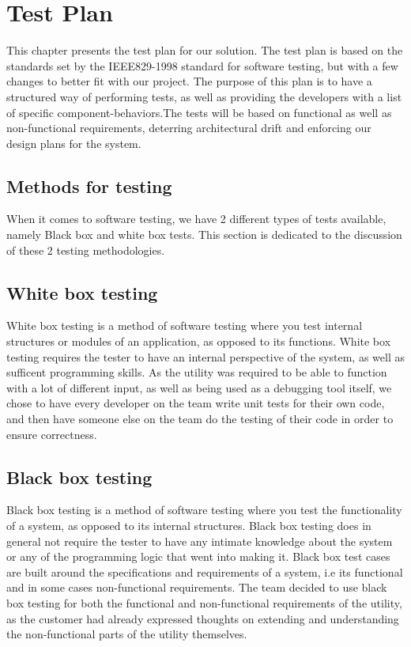 \chapter{Test Plan}
This chapter presents the test plan for our solution. The test plan is based on
the standards set by the IEEE829-1998 standard for software testing, but with a
few changes to better fit with our project. The purpose of this plan is to have
a structured way of performing tests, as well as providing the developers with
a list of specific component-behaviors.The tests will be based on functional as
well as non-functional requirements, deterring architectural drift and
enforcing our design plans for the system.

\section{Methods for testing}
When it comes to software testing, we have 2 different types of tests available, namely Black box and white box tests. This section is dedicated to the discussion of these 2 testing methodologies.

\section{White box testing}
White box testing is a method of software testing where you test internal structures or modules of an application, as opposed to its functions. White box testing requires the tester to have an internal perspective of the system, as well as sufficent programming skills. As the utility was required to be able to function with a lot of different input, as well as being used as a debugging tool itself, we chose to have every developer on the team write unit tests for their own code, and then have someone else on the team do the testing of their code in order to ensure correctness.

\section{Black box testing}
Black box testing is a method of software testing where you test the functionality of a system, as opposed to its internal structures. Black box testing does in general not require the tester to have any intimate knowledge about the system or any of the programming logic that went into making it. Black box test cases are built around the specifications and requirements of a system, i.e its functional and in some cases non-functional requirements. The team decided to use black box testing for both the functional and non-functional requirements of the utility, as the customer had already expressed thoughts on extending and understanding the non-functional parts of the utility themselves. 


